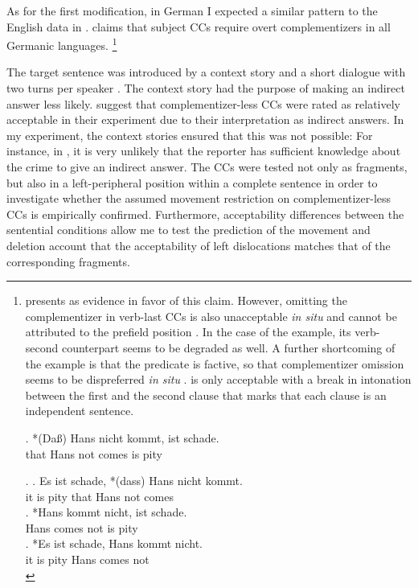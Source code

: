 As for the first modification, in German I expected a similar pattern to the English data in \citet{merchant.etal2013}. \citet[83]{webelhuth1992} claims that subject CCs require overt complementizers in all Germanic languages.%
%
\footnote{\citeauthor{webelhuth1992} presents \Next as evidence in favor of this claim. However, omitting the complementizer in verb-last CCs is also unacceptable \textit{in situ} and cannot be attributed to the prefield position \NNext[a]. In the case of the example, its verb-second counterpart \NNext[b] seems to be degraded as well. A further shortcoming of the example is that the predicate is factive, so that complementizer omission seems to be dispreferred \textit{in situ} \NNext[c]. \NNext[c] is only acceptable with a break in intonation between the first and the second clause that marks that each clause is an independent sentence.

\exg. *(Da\ss) Hans nicht kommt, ist schade.\\
that Hans not comes is pity\\

\ex. \ag. Es ist schade, *(dass) Hans nicht kommt.\\
	  it is pity that Hans not comes\\
     \bg. *Hans kommt nicht, ist schade.\\
	  Hans comes not is pity\\
    \cg.  *Es ist schade, Hans kommt nicht.\\
	  it is  pity Hans comes not\\


}\afterfn %

The target sentence was introduced by a context story and a short dialogue with two turns per speaker \Next. The context story had the purpose of making an indirect answer less likely. \citet{merchant.etal2013} suggest that complementizer-less CCs were rated as relatively acceptable in their experiment due to their interpretation as indirect answers. In my experiment, the context stories ensured that this was not possible: For instance, in \Next, it is very unlikely that the reporter has sufficient knowledge about the crime to give an indirect answer. The CCs were tested not only as fragments, but also in a left-peripheral position within a complete sentence in order to investigate whether the assumed movement restriction on complementizer-less CCs is empirically confirmed. Furthermore, acceptability differences between the sentential conditions allow me to test the prediction of the movement and deletion account that the acceptability of left dislocations matches that of the corresponding fragments.

